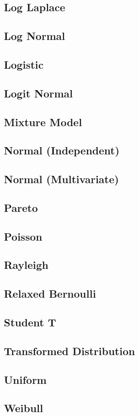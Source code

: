 \subsection{Log Laplace}
\subsection{Log Normal}
\subsection{Logistic}
\subsection{Logit Normal}
\subsection{Mixture Model}
\subsection{Normal (Independent)}
\subsection{Normal (Multivariate)}
\subsection{Pareto}
\subsection{Poisson}
\subsection{Rayleigh}
\subsection{Relaxed Bernoulli}
\subsection{Student T}
\subsection{Transformed Distribution}
\subsection{Uniform}
\subsection{Weibull}
